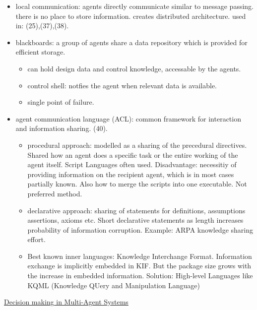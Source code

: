 \begin{itemize}[noitemsep,nolistsep]
	\item local communication: agents directly communicate similar to message passing. there is no place to store information. creates distributed architecture. used in: (25),(37),(38).
	\item blackboards: a group of agents share a data repository which is provided for efficient storage.
	\begin{itemize}[noitemsep,nolistsep]
		\item can hold design data and control knowledge, accessable by the agents.
		\item control shell: notfies the agent when relevant data is available.
		\item single point of failure.
	\end{itemize}
	\item agent communication language (ACL): common framework for interaction and information sharing. (40).
	\begin{itemize}[noitemsep,nolistsep]
		\item procedural approach: modelled as a sharing of the precedural directives. Shared how an agent does a specific task or the entire working of the agent itself. Script Languages often used. Disadvantage: necessitiy of providing information on the recipient agent, which is in most cases partially known. Also how to merge the scripts into one executable. Not preferred method.
		\item declarative approach: sharing of statements for definitions, assumptions assertions, axioms etc. Short declarative statements as length increases probability of information corruption. Example: ARPA knowledge sharing effort.
		\item Best known inner languages: Knowledge Interchange Format. Information exchange is implicitly embedded in KIF. But the package size grows with the increase in embedded information. Solution: High-level Languages like KQML (Knowledge QUery and Manipulation Language)
	\end{itemize}
\end{itemize}
\underline{Decision making in Multi-Agent Systems}
